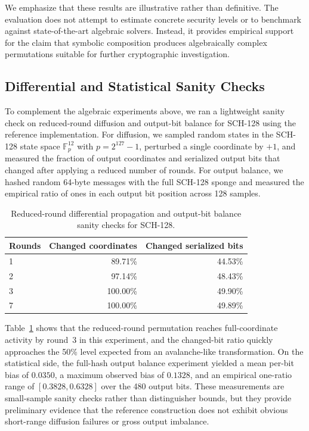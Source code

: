 ﻿\documentclass[english]{aucmcs}
\begin{document}
We emphasize that these results are illustrative rather than definitive. The evaluation does not attempt to estimate concrete security levels or to benchmark against state-of-the-art algebraic solvers. Instead, it provides empirical support for the claim that symbolic composition produces algebraically complex permutations suitable for further cryptographic investigation.

\subsection{Differential and Statistical Sanity Checks}

To complement the algebraic experiments above, we ran a lightweight sanity
check on reduced-round diffusion and output-bit balance for SCH-128 using the
reference implementation. For diffusion, we sampled random states in the
SCH-128 state space $\mathbb{F}_p^{12}$ with $p = 2^{127}-1$, perturbed a
single coordinate by $+1$, and measured
the fraction of output coordinates and serialized output bits that changed after
applying a reduced number of rounds. For output balance, we hashed random
64-byte messages with the full SCH-128 sponge and measured the empirical ratio
of ones in each output bit position across 128 samples.

\begin{table}[H]
\centering
\caption{Reduced-round differential propagation and output-bit balance sanity checks for SCH-128.}
\label{tab:sch128-diffusion-sanity}
\begin{tabular}{@{}lrr@{}}
\toprule
Rounds & Changed coordinates & Changed serialized bits \\
\midrule
1 & 89.71\% & 44.53\% \\
2 & 97.14\% & 48.43\% \\
3 & 100.00\% & 49.90\% \\
7 & 100.00\% & 49.89\% \\
\bottomrule
\end{tabular}
\end{table}

Table~\ref{tab:sch128-diffusion-sanity} shows that the reduced-round
permutation reaches full-coordinate activity by round~3 in this experiment, and
the changed-bit ratio quickly approaches the 50\% level expected from an
avalanche-like transformation. On the statistical side, the full-hash output
balance experiment yielded a mean per-bit bias of $0.0350$, a maximum observed
bias of $0.1328$, and an empirical one-ratio range of $[0.3828, 0.6328]$ over
the 480 output bits. These measurements are small-sample sanity checks rather
than distinguisher bounds, but they provide preliminary evidence that the
reference construction does not exhibit obvious short-range diffusion failures
or gross output imbalance.
\end{document}

